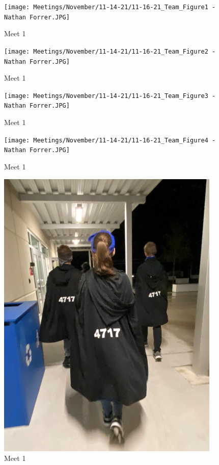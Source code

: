  

\begin{figure}[ht]
\centering
\begin{minipage}[b]{.48\textwidth}
  \centering
  \texttt{[image: Meetings/November/11-14-21/11-16-21\_Team\_Figure1 - Nathan Forrer.JPG]}
  \caption{Meet 1}
  \label{fig:111421_1}
\end{minipage}%
\hfill%
\begin{minipage}[b]{.48\textwidth}
  \centering
  \texttt{[image: Meetings/November/11-14-21/11-16-21\_Team\_Figure2 - Nathan Forrer.JPG]}
  \caption{Meet 1}
  \label{fig:111421_2}
\end{minipage}
\end{figure}

\begin{figure}[ht]
\centering
\begin{minipage}[b]{.48\textwidth}
  \centering
  \texttt{[image: Meetings/November/11-14-21/11-16-21\_Team\_Figure3 - Nathan Forrer.JPG]}
  \caption{Meet 1}
  \label{fig:111421_3}
\end{minipage}%
\hfill%
\begin{minipage}[b]{.48\textwidth}
  \centering
  \texttt{[image: Meetings/November/11-14-21/11-16-21\_Team\_Figure4 - Nathan Forrer.JPG]}
  \caption{Meet 1}
  \label{fig:111421_4}
\end{minipage}
\end{figure}


\begin{figure}[htp]
\centering
\includegraphics[width=0.95\textwidth, angle=0]{Meetings/November/11-14-21/11-16-21_Team_Figure5 - Nathan Forrer.JPG}
\caption{Meet 1}
\label{fig:111421_5}
\end{figure}



